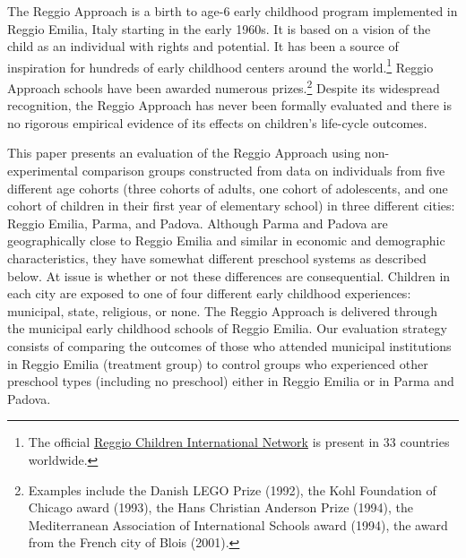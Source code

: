 The Reggio Approach is a birth to age-6 early childhood program implemented in Reggio Emilia, Italy starting in the early 1960s. It is based on a vision of the child as an individual with rights and potential. It has been a source of inspiration for hundreds of early childhood centers around the world.\footnote{The official \href{http://www.reggiochildren.it/network/?lang=en}{Reggio Children International Network} is present in 33 countries worldwide.} Reggio Approach schools have been awarded numerous prizes.\footnote{Examples include the Danish LEGO Prize (1992), the Kohl Foundation of Chicago award (1993), the Hans Christian Anderson Prize (1994), the Mediterranean Association of International Schools award (1994), the award from the French city of Blois (2001).} Despite its widespread recognition, the Reggio Approach has never been formally evaluated and there is no rigorous empirical evidence of its effects on children's life-cycle outcomes.

This paper presents an evaluation of the Reggio Approach using non-experimental comparison groups constructed from data on individuals from five different age cohorts (three cohorts of adults, one cohort of adolescents, and one cohort of children in their first year of elementary school) in three different cities: Reggio Emilia, Parma, and Padova. Although Parma and Padova are geographically close to Reggio Emilia and similar in economic and demographic characteristics, they have somewhat different preschool systems as described below. At issue is whether or not these differences are consequential. Children in each city are exposed to one of four different early childhood experiences: municipal, state, religious, or none. The Reggio Approach is delivered through the municipal early childhood schools of Reggio Emilia. Our evaluation strategy consists of comparing the outcomes of those who attended municipal institutions in Reggio Emilia (treatment group) to control groups who experienced other preschool types (including no preschool) either in Reggio Emilia or in Parma and Padova.

